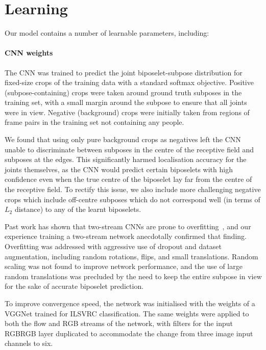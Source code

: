 \documentclass[runningheads]{llncs}
\begin{document}
\section{Learning}\label{sec:learning}

Our model contains a number of learnable parameters, including:

\paragraph{CNN weights} The CNN was trained to predict the joint
biposelet-subpose distribution for fixed-size crops of the training data with a
standard softmax objective. Positive (subpose-containing) crops were taken
around ground truth subposes in the training set, with a small margin around the
subpose to ensure that all joints were in view. Negative (background) crops were
initially taken from regions of frame pairs in the training set not containing
any people.

We found that using only pure background crops as negatives left the CNN unable
to discriminate between subposes in the centre of the receptive field and
subposes at the edges. This significantly harmed localisation accuracy for the
joints themselves, as the CNN would predict certain biposelets with high
confidence even when the true centre of the biposelet lay far from the centre of
the receptive field. To rectify this issue, we also include more challenging
negative crops which include off-centre subposes which do not correspond well
(in terms of $L_2$ distance) to any of the learnt biposelets.

Past work has shown that two-stream CNNs are prone to
overfitting~\cite{wang2015towards}, and our experience training a two-stream
network anecdotally confirmed that finding. Overfitting was addressed with
aggressive use of dropout and dataset augmentation, including random rotations,
flips, and small translations. Random scaling was not found to improve network
performance, and the use of large random translations was precluded by the need
to keep the entire subpose in view for the sake of accurate biposelet
prediction.

To improve convergence speed, the network was initialised with the weights of a
VGGNet trained for ILSVRC classification. The same weights were applied to both
the flow and RGB streams of the network, with filters for the input RGBRGB layer
duplicated to accommodate the change from three image input channels to six.
\end{document}
